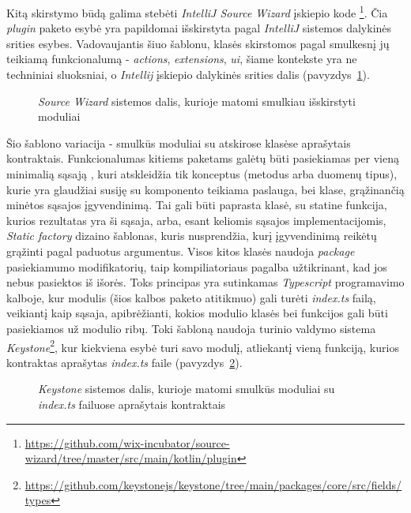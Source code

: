 Kitą skirstymo būdą galima stebėti \textit{IntelliJ Source Wizard} įskiepio kode \footnote{\url{https://github.com/wix-incubator/source-wizard/tree/master/src/main/kotlin/plugin}}.
Čia \textit{plugin} paketo esybė yra papildomai išskirstyta pagal \textit{IntelliJ} sistemos dalykinės srities esybes.
Vadovaujantis šiuo šablonu, klasės skirstomos pagal smulkesnį jų teikiamą funkcionalumą - \textit{actions}, \textit{extensions}, \textit{ui},
šiame kontekste yra ne techniniai sluoksniai, o \textit{Intellij} įskiepio dalykinės srities dalis (pavyzdys~\ref{fig:modules}).
\begin{figure}[H]
    \snugshade
    \endsnugshade
    \caption{\textit{Source Wizard} sistemos dalis, kurioje matomi smulkiau išskirstyti moduliai}
    \label{fig:modules}
\end{figure}

Šio šablono variacija - smulkūs moduliai su atskirose klasėse aprašytais kontraktais.
Funkcionalumas kitiems paketams galėtų būti pasiekiamas per vieną minimalią sąsają ,
kuri atskleidžia tik konceptus (metodus arba duomenų tipus), kurie yra glaudžiai susiję su komponento teikiama paslauga, bei
klase, grąžinančią minėtos sąsajos įgyvendinimą.
Tai gali būti paprasta klasė, su statine funkcija, kurios rezultatas yra ši sąsaja, arba, esant keliomis sąsajos implementacijomis,
\textit{Static factory} dizaino šablonas, kuris nusprendžia, kurį įgyvendinimą reikėtų grąžinti pagal paduotus argumentus.
Visos kitos klasės naudoja \textit{package} pasiekiamumo modifikatorių, taip kompiliatoriaus pagalba užtikrinant,
kad jos nebus pasiektos iš išorės.
Toks principas yra sutinkamas \textit{Typescript} programavimo kalboje, kur modulis (šios kalbos paketo atitikmuo) gali turėti
\textit{index.ts} failą, veikiantį kaip sąsaja, apibrėžianti, kokios modulio klasės bei funkcijos gali būti pasiekiamos už modulio ribų.
Toki šabloną naudoja turinio valdymo sistema \textit{Keystone}\footnote{\url{https://github.com/keystonejs/keystone/tree/main/packages/core/src/fields/types}},
kur kiekviena esybė turi savo modulį, atliekantį vieną funkciją, kurios kontraktas aprašytas \textit{index.ts} faile (pavyzdys~\ref{fig:kontraktai}).

\begin{figure}[H]
    \snugshade
    \endsnugshade
    \caption{\textit{Keystone} sistemos dalis, kurioje matomi smulkūs moduliai su \textit{index.ts} failuose aprašytais kontraktais}
    \label{fig:kontraktai}
\end{figure}

